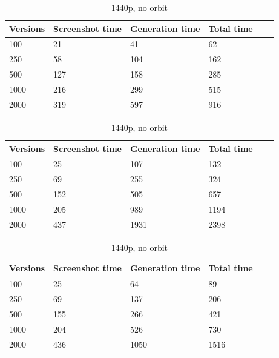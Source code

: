 \documentclass[]{usiinfbachelorproject}
\begin{document}
\begin{table}[H]
    \begin{center}
        \begin{tabular}{ | l | l | l | l | l | l |}
        \hline
        Versions & Screenshot time & Generation time & Total time \\ \hline
        100 & 21 & 41 & 62 \\ \hline
        250 & 58 & 104 & 162\\ \hline
        500 & 127 & 158 & 285\\ \hline
        1000 & 216 & 299 & 515\\ \hline
        2000 & 319 & 597 & 916\\ \hline
        \end{tabular}
    \end{center}
    \caption{1080p, no orbit}
    \label{tab:performance}

    \begin{center}
        \begin{tabular}{ | l | l | l | l | l | l |}
        \hline
        Versions & Screenshot time & Generation time & Total time \\ \hline
        100 & 25 & 107 & 132 \\ \hline
        250 & 69 & 255 & 324\\ \hline
        500 & 152 & 505 & 657\\ \hline
        1000 & 205 & 989 & 1194\\ \hline
        2000 & 437 & 1931 & 2398\\ \hline
        \end{tabular}
    \end{center}
    \caption{1440p, orbit}
    \label{tab:performance}

    \begin{center}
        \begin{tabular}{ | l | l | l | l | l | l |}
        \hline
        Versions & Screenshot time & Generation time & Total time \\ \hline
        100 & 25 & 64 & 89 \\ \hline
        250 & 69 & 137 & 206\\ \hline
        500 & 155 & 266 & 421\\ \hline
        1000 & 204 & 526 & 730\\ \hline
        2000 & 436 & 1050 & 1516\\ \hline
        \end{tabular}
    \end{center}
    \caption{1440p, no orbit}
    \label{tab:performance}
\end{table}
\end{document}
